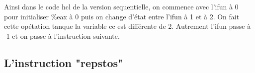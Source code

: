 \documentclass[12pt]{article}
\begin{document}
Ainsi dans le code hcl de la version sequentielle, on commence avec l'ifun à 0 
pour initialiser \%eax à 0 puis on change d'état entre l'ifun à 1 et à 2. On fait cette opétation tanque la variable cc est différente de 2.
Autrement l'ifun passe à -1 et on passe à l'instruction suivante.

\subsection{L'instruction "repstos"}
\end{document}
